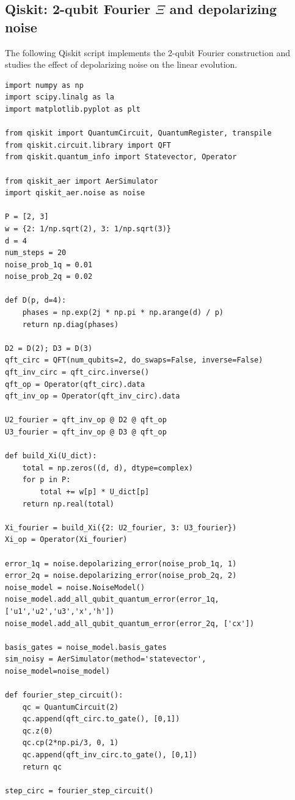 \documentclass[11pt]{article}
\begin{document}
\subsection{Qiskit: 2-qubit Fourier $\Xi$ and depolarizing noise}

The following Qiskit script implements the 2-qubit Fourier construction and studies the effect of depolarizing noise on the linear evolution.

\begin{verbatim}
import numpy as np
import scipy.linalg as la
import matplotlib.pyplot as plt

from qiskit import QuantumCircuit, QuantumRegister, transpile
from qiskit.circuit.library import QFT
from qiskit.quantum_info import Statevector, Operator

from qiskit_aer import AerSimulator
import qiskit_aer.noise as noise

P = [2, 3]
w = {2: 1/np.sqrt(2), 3: 1/np.sqrt(3)}
d = 4
num_steps = 20
noise_prob_1q = 0.01
noise_prob_2q = 0.02

def D(p, d=4):
    phases = np.exp(2j * np.pi * np.arange(d) / p)
    return np.diag(phases)

D2 = D(2); D3 = D(3)
qft_circ = QFT(num_qubits=2, do_swaps=False, inverse=False)
qft_inv_circ = qft_circ.inverse()
qft_op = Operator(qft_circ).data
qft_inv_op = Operator(qft_inv_circ).data

U2_fourier = qft_inv_op @ D2 @ qft_op
U3_fourier = qft_inv_op @ D3 @ qft_op

def build_Xi(U_dict):
    total = np.zeros((d, d), dtype=complex)
    for p in P:
        total += w[p] * U_dict[p]
    return np.real(total)

Xi_fourier = build_Xi({2: U2_fourier, 3: U3_fourier})
Xi_op = Operator(Xi_fourier)

error_1q = noise.depolarizing_error(noise_prob_1q, 1)
error_2q = noise.depolarizing_error(noise_prob_2q, 2)
noise_model = noise.NoiseModel()
noise_model.add_all_qubit_quantum_error(error_1q, ['u1','u2','u3','x','h'])
noise_model.add_all_qubit_quantum_error(error_2q, ['cx'])

basis_gates = noise_model.basis_gates
sim_noisy = AerSimulator(method='statevector', noise_model=noise_model)

def fourier_step_circuit():
    qc = QuantumCircuit(2)
    qc.append(qft_circ.to_gate(), [0,1])
    qc.z(0)
    qc.cp(2*np.pi/3, 0, 1)
    qc.append(qft_inv_circ.to_gate(), [0,1])
    return qc

step_circ = fourier_step_circuit()


\end{verbatim}
\end{document}
